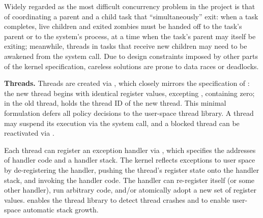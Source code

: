 Widely regarded as the most difficult concurrency problem in the project
is that of coordinating a parent and a child task that ``simultaneously''
exit:
when a task completes,
live children and exited zombies must be handed off
to the task's parent or to the system's  process,
at a time when the task's parent may itself be
exiting;
meanwhile, threads in tasks that receive new children
may need to be awakened from the  system call.
Due to design constraints imposed by other parts of the kernel specification,
careless solutions %
are prone to data races or deadlocks.

{\bf Threads.}
Threads are created via
, which closely
mirrors the specification of :
the new thread begins with identical %
register values,
excepting , containing zero;
in the old thread,  holds the thread ID
of the new thread.
This minimal formulation defers all policy decisions
to the
user-space thread library.
A thread may suspend its execution via the
 system call,
and a blocked thread can be reactivated via
.

Each thread
can register an exception handler
via ,
which specifies the addresses of handler code
and a handler stack.
The kernel reflects exceptions to user space
by
de-registering the handler,
pushing the thread's register state onto the handler stack,
and invoking the handler code.
The handler
can re-register itself
(or some other handler),
run arbitrary code,
and/or atomically adopt a new set of register
values.
 enables
the thread library to detect %
thread crashes
and %
to enable user-space automatic stack growth.



